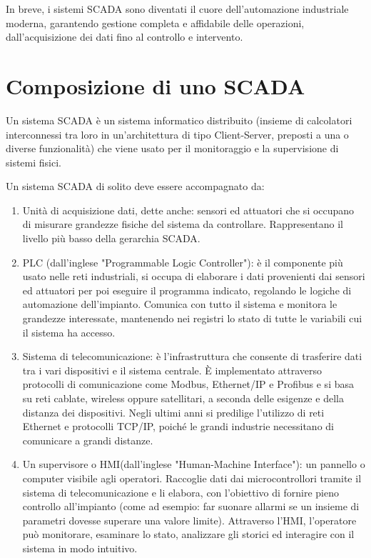 In breve, i sistemi SCADA sono diventati il cuore dell'automazione industriale moderna, garantendo gestione completa e affidabile delle operazioni, dall'acquisizione dei dati fino al controllo e intervento.

\section{Composizione di uno SCADA}
Un sistema SCADA è un sistema informatico distribuito (insieme di calcolatori interconnessi tra loro in un'architettura di tipo Client-Server, preposti a una o diverse funzionalità) che viene usato per il monitoraggio e la supervisione di sistemi fisici.

Un sistema SCADA di solito deve essere accompagnato da:
\begin{enumerate}
    \item Unità di acquisizione dati, dette anche: sensori ed attuatori che si occupano di misurare grandezze fisiche del sistema da controllare. Rappresentano il livello più basso della gerarchia SCADA.
    \item PLC (dall'inglese "Programmable Logic Controller"): è il componente più usato nelle reti industriali, si occupa di elaborare i dati provenienti dai sensori ed attuatori per poi eseguire il programma indicato, regolando le logiche di automazione dell'impianto. Comunica con tutto il sistema e monitora le grandezze interessate, mantenendo nei registri lo stato di tutte le variabili cui il sistema ha accesso.
    \item Sistema di telecomunicazione: è l'infrastruttura che consente di trasferire dati tra i vari dispositivi e il sistema centrale. È implementato attraverso protocolli di comunicazione come Modbus, Ethernet/IP e Profibus e si basa su reti cablate, wireless oppure satellitari, a seconda delle esigenze e della distanza dei dispositivi. Negli ultimi anni si predilige l'utilizzo di reti Ethernet e protocolli TCP/IP, poiché le grandi industrie necessitano di comunicare a grandi distanze.
    \item Un supervisore o HMI(dall'inglese "Human-Machine Interface"): un pannello o computer visibile agli operatori. Raccoglie dati dai microcontrollori tramite il sistema di telecomunicazione e li elabora, con l'obiettivo di fornire pieno controllo all'impianto (come ad esempio: far suonare allarmi se un insieme di parametri dovesse superare una valore limite). Attraverso l'HMI, l'operatore può monitorare, esaminare lo stato, analizzare gli storici ed interagire con il sistema in modo intuitivo.
\end{enumerate}
